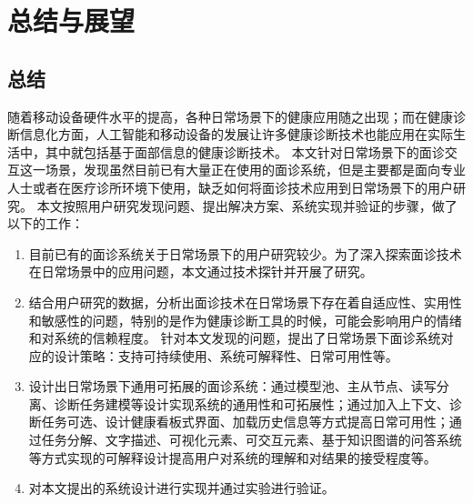 \chapter{总结与展望}
\section{总结}
随着移动设备硬件水平的提高，各种日常场景下的健康应用随之出现；而在健康诊断信息化方面，人工智能和移动设备的发展让许多健康诊断技术也能应用在实际生活中，其中就包括基于面部信息的健康诊断技术。
本文针对日常场景下的面诊交互这一场景，发现虽然目前已有大量正在使用的面诊系统，但是主要都是面向专业人士或者在医疗诊所环境下使用，缺乏如何将面诊技术应用到日常场景下的用户研究。
本文按照用户研究发现问题、提出解决方案、系统实现并验证的步骤，做了以下的工作：
\begin{enumerate}
	\item 目前已有的面诊系统关于日常场景下的用户研究较少。为了深入探索面诊技术在日常场景中的应用问题，本文通过技术探针并开展了研究。

	\item 结合用户研究的数据，分析出面诊技术在日常场景下存在着自适应性、实用性和敏感性的问题，特别的是作为健康诊断工具的时候，可能会影响用户的情绪和对系统的信赖程度。
	针对本文发现的问题，提出了日常场景下面诊系统对应的设计策略：支持可持续使用、系统可解释性、日常可用性等。

	\item 设计出日常场景下通用可拓展的面诊系统：通过模型池、主从节点、读写分离、诊断任务建模等设计实现系统的通用性和可拓展性；通过加入上下文、诊断任务可选、设计健康看板式界面、加载历史信息等方式提高日常可用性；通过任务分解、文字描述、可视化元素、可交互元素、基于知识图谱的问答系统等方式实现的可解释设计提高用户对系统的理解和对结果的接受程度等。

	\item 对本文提出的系统设计进行实现并通过实验进行验证。
\end{enumerate}


